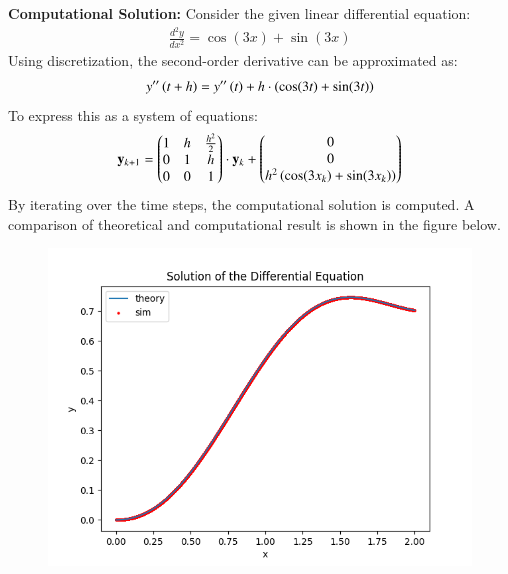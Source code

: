 \documentclass[journal]{IEEEtran}
\begin{document}
\textbf{Computational Solution:}
\newline
Consider the given linear differential equation:
\begin{align}
    \frac{d^2y}{dx^2} = \cos(3x) + \sin(3x)
\end{align}
Using discretization, the second-order derivative can be approximated as:
\begin{align}
    y^{\prime\prime}\left(t+h\right) = y^{\prime\prime}\left(t\right) + h \cdot \left( \cos(3t) + \sin(3t) \right)
\end{align}
\newline
To express this as a system of equations:
\begin{align}
    \mathbf{y}_{k+1} = \begin{pmatrix}1 & h & \frac{h^2}{2}\\ 0 & 1 & h\\ 0 & 0 & 1\end{pmatrix} \cdot \mathbf{y}_k + \begin{pmatrix}0\\ 0\\ h^2\left(\cos(3x_k) + \sin(3x_k)\right)\end{pmatrix}
\end{align}
\newline
By iterating over the time steps, the computational solution is computed. A comparison of theoretical and computational result is shown in the figure below.
\begin{figure}[h!]
   \centering
   \includegraphics[width=\columnwidth]{figs/fig.png}
   \label{comparison}
\end{figure}
\newline
\end{document}
